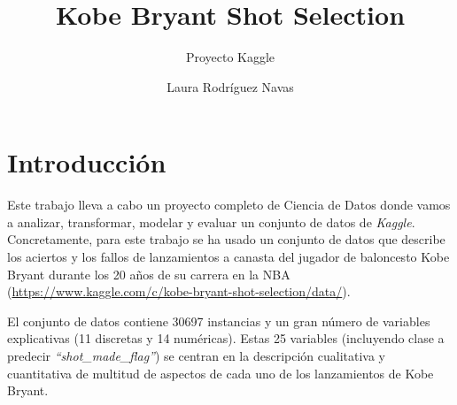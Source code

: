\documentclass[
]{article}
\title{\textbf{Kobe Bryant Shot Selection}}
\subtitle{Proyecto Kaggle}
\author{Laura Rodríguez Navas}
\date{}
\begin{document}
\maketitle

\hypertarget{introducciuxf3n}{%
\section{\texorpdfstring{\textbf{Introducción}}{Introducción}}\label{introducciuxf3n}}

Este trabajo lleva a cabo un proyecto completo de Ciencia de Datos donde
vamos a analizar, transformar, modelar y evaluar un conjunto de datos de
\emph{Kaggle}. Concretamente, para este trabajo se ha usado un conjunto
de datos que describe los aciertos y los fallos de lanzamientos a
canasta del jugador de baloncesto Kobe Bryant durante los 20 años de su
carrera en la NBA
(\url{https://www.kaggle.com/c/kobe-bryant-shot-selection/data/}).

El conjunto de datos contiene 30697 instancias y un gran número de
variables explicativas (11 discretas y 14 numéricas). Estas 25 variables
(incluyendo clase a predecir \emph{``shot\_made\_flag''}) se centran en
la descripción cualitativa y cuantitativa de multitud de aspectos de
cada uno de los lanzamientos de Kobe Bryant.
\end{document}
